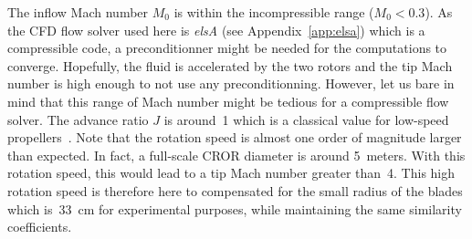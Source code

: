 The inflow Mach number $M_0$ is within the incompressible range
($M_0 < 0.3$). As the CFD flow solver used here is \emph{elsA}
(see Appendix~\ref{app:elsa}) which is a compressible code, 
a preconditionner might be needed for the computations to converge. 
Hopefully, the fluid is accelerated by the two rotors
and the tip Mach number is high enough to not use any preconditionning.
However, let us bare in mind that this range of Mach number might
be tedious for a compressible flow solver.
The advance ratio $J$ is around~1 which is a classical value for
low-speed propellers~\cite{Bousquet2012}. Note that the rotation speed is almost
one order of magnitude larger than expected. 
In fact, a full-scale CROR diameter is around 5~meters. With this rotation speed,
this would lead to a tip Mach number greater than~4. This high rotation speed is 
therefore here to compensated for the small radius of the blades which is~33~cm
for experimental purposes, while maintaining the same similarity coefficients.

